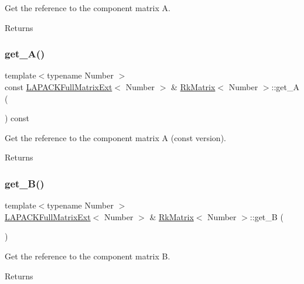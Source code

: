 Get the reference to the component matrix {\ttfamily A}. \begin{DoxyReturn}{Returns}

\end{DoxyReturn}
\mbox{\label{classRkMatrix_a95e786794895f1ceae2e0f2880e105b3}} 
\subsubsection{\texorpdfstring{get\+\_\+\+A()}{get\_A()}\hspace{0.1cm}{\footnotesize\ttfamily [2/2]}}
{\footnotesize\ttfamily template$<$typename Number $>$ \\
const \hyperlink{classLAPACKFullMatrixExt}{L\+A\+P\+A\+C\+K\+Full\+Matrix\+Ext}$<$ Number $>$ \& \hyperlink{classRkMatrix}{Rk\+Matrix}$<$ Number $>$\+::get\+\_\+A (\begin{DoxyParamCaption}{ }\end{DoxyParamCaption}) const}

Get the reference to the component matrix {\ttfamily A} (const version). \begin{DoxyReturn}{Returns}

\end{DoxyReturn}
\mbox{\label{classRkMatrix_aca855d29d0dd3036ba75d0e3ca75d88e}} 
\subsubsection{\texorpdfstring{get\+\_\+\+B()}{get\_B()}\hspace{0.1cm}{\footnotesize\ttfamily [1/2]}}
{\footnotesize\ttfamily template$<$typename Number $>$ \\
\hyperlink{classLAPACKFullMatrixExt}{L\+A\+P\+A\+C\+K\+Full\+Matrix\+Ext}$<$ Number $>$ \& \hyperlink{classRkMatrix}{Rk\+Matrix}$<$ Number $>$\+::get\+\_\+B (\begin{DoxyParamCaption}{ }\end{DoxyParamCaption})}

Get the reference to the component matrix {\ttfamily B}. \begin{DoxyReturn}{Returns}

\end{DoxyReturn}
\mbox{\label{classRkMatrix_a69695b04d890d753bd3343e4665ca0ba}} 
